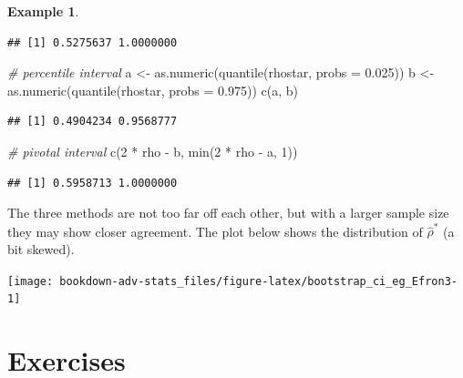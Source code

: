 \documentclass[
]{book}
\newenvironment{Shaded}{\begin{snugshade}}{\end{snugshade}}
\newcommand{\AttributeTok}[1]{\textcolor[rgb]{0.77,0.63,0.00}{#1}}
\newcommand{\CommentTok}[1]{\textcolor[rgb]{0.56,0.35,0.01}{\textit{#1}}}
\newcommand{\DecValTok}[1]{\textcolor[rgb]{0.00,0.00,0.81}{#1}}
\newcommand{\FloatTok}[1]{\textcolor[rgb]{0.00,0.00,0.81}{#1}}
\newcommand{\FunctionTok}[1]{\textcolor[rgb]{0.00,0.00,0.00}{#1}}
\newcommand{\NormalTok}[1]{#1}
\newcommand{\OtherTok}[1]{\textcolor[rgb]{0.56,0.35,0.01}{#1}}
\newcommand{\SpecialCharTok}[1]{\textcolor[rgb]{0.00,0.00,0.00}{#1}}
\theoremstyle{definition}
\theoremstyle{definition}
\newtheorem{example}{Example}[chapter]
\theoremstyle{definition}
\theoremstyle{definition}
\theoremstyle{remark}
\begin{document}
\begin{example}
\begin{verbatim}
## [1] 0.5275637 1.0000000
\end{verbatim}

\begin{Shaded}
\begin{Highlighting}[]
\CommentTok{\# percentile interval}
\NormalTok{a }\OtherTok{\textless{}{-}} \FunctionTok{as.numeric}\NormalTok{(}\FunctionTok{quantile}\NormalTok{(rhostar, }\AttributeTok{probs =} \FloatTok{0.025}\NormalTok{))}
\NormalTok{b }\OtherTok{\textless{}{-}} \FunctionTok{as.numeric}\NormalTok{(}\FunctionTok{quantile}\NormalTok{(rhostar, }\AttributeTok{probs =} \FloatTok{0.975}\NormalTok{))}
\FunctionTok{c}\NormalTok{(a, b)}
\end{Highlighting}
\end{Shaded}

\begin{verbatim}
## [1] 0.4904234 0.9568777
\end{verbatim}

\begin{Shaded}
\begin{Highlighting}[]
\CommentTok{\# pivotal interval}
\FunctionTok{c}\NormalTok{(}\DecValTok{2} \SpecialCharTok{*}\NormalTok{ rho }\SpecialCharTok{{-}}\NormalTok{ b, }\FunctionTok{min}\NormalTok{(}\DecValTok{2} \SpecialCharTok{*}\NormalTok{ rho }\SpecialCharTok{{-}}\NormalTok{ a, }\DecValTok{1}\NormalTok{))}
\end{Highlighting}
\end{Shaded}

\begin{verbatim}
## [1] 0.5958713 1.0000000
\end{verbatim}

The three methods are not too far off each other, but with a larger sample size they may show closer agreement. The plot below shows the distribution of \(\hat\rho^*\) (a bit skewed).

\begin{center}\texttt{[image: bookdown-adv-stats\_files/figure-latex/bootstrap\_ci\_eg\_Efron3-1]} \end{center}

\end{example}

\hypertarget{exercises-5}{%
\section{Exercises}\label{exercises-5}}
\end{document}

